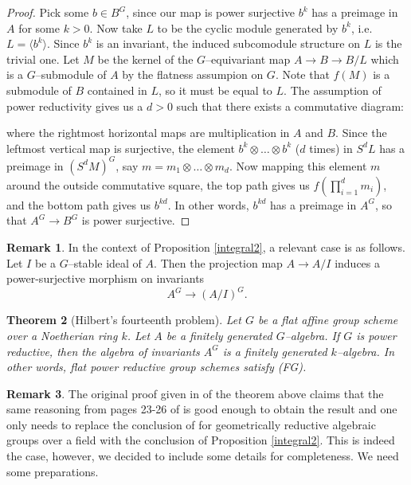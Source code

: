 \documentclass{article}
\theoremstyle{plain}
\newtheorem{Th}{Theorem}[section]
\theoremstyle{definition}
\newtheorem{Rem}[Th]{Remark}
\begin{document}
\begin{proof}
 Pick some $b\in B^G$, since our map is power surjective $b^k$ has a preimage in $A$ for some $k>0$. Now take $L$ to be the cyclic module generated by $b^k$, i.e. $L=\langle b^k\rangle$. Since $b^k$ is an invariant, the induced subcomodule structure on $L$ is the trivial one. Let $M$ be the kernel of the $G$--equivariant map $A\to B\to B/L$ which is a $G$--submodule of $A$ by the flatness assumpion on $G$. Note that $f(M)$ is a submodule of $B$ contained in $L$, so it must be equal to $L$. 
The assumption of power reductivity gives us a $d>0$ such that there exists a commutative diagram:
 \begin{center}
\end{center}
where the rightmost horizontal maps are multiplication in $A$ and $B$. Since the leftmost vertical map is surjective, the element $b^k\otimes \dots \otimes b^k$ ($d$ times) in $S^dL$ has a preimage in $(S^dM)^G$, say $m=m_1\otimes \dots \otimes m_d$. Now mapping this element $m$ around the outside commutative square, the top path gives us $f(\prod_{i=1}^d m_i)$, and the bottom path gives us $b^{kd}$. In other words, $b^{kd}$ has a preimage in $A^G$, so that $A^G\to B^G$ is power surjective.
\end{proof}

\begin{Rem}
  In the context of  Proposition \ref{integral2}, a relevant case is as follows. Let $I$ be a $G$--stable ideal of $A$. Then the projection map $A\to A/I$ induces a power-surjective morphism on invariants 
  \[A^G\to (A/I)^G.\]
\end{Rem}



\begin{Th}[Hilbert's fourteenth problem]\label{Hilberts 14th}
    Let $G$ be a flat affine group scheme over a Noetherian ring $k$. Let $A$ be a finitely generated $G$--algebra. If $G$ is power reductive, then the algebra of invariants $A^G$ is a finitely generated $k$--algebra. In other words, flat power reductive group schemes satisfy (FG).
\end{Th}

\begin{Rem}
   The original proof given in \cite{FvdK10} of the theorem above claims that the same reasoning from pages 23-26 of \cite{springer2006invariant} is good enough to obtain the result and one only needs to replace the conclusion of \cite[Lemma 2.4.7]{springer2006invariant} for geometrically reductive algebraic groups over a field with the conclusion of Proposition \ref{integral2}. This is indeed the case, however, we decided to include some details for completeness. We need some preparations. 
\end{Rem}
\end{document}
